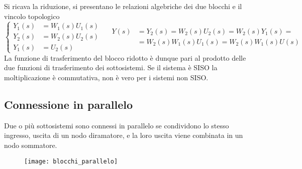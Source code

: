 Si ricava la riduzione, si presentano le relazioni algebriche dei due blocchi e
il vincolo topologico
$$\left\{\begin{aligned}
Y_1(s) &= W_1(s)U_1(s) \\
Y_2(s) &= W_2(s) U_2(s) \\
Y_1(s) &= U_2(s)
\end{aligned}\right.
\quad
\begin{aligned}
Y(s) &= Y_2(s) = W_2(s)U_2(s) = W_2(s)Y_1(s) =\\
&=W_2(s)W_1(s)U_1(s) = W_2(s)W_1(s)U(s)
\end{aligned}$$
La funzione di trasferimento del blocco ridotto è dunque pari al prodotto delle
due funzioni di trasferimento dei sottosistemi.
Se il sistema è SISO la moltiplicazione è commutativa, non è vero per i sistemi
non SISO.

\newpage
\subsection{Connessione in parallelo}
Due o più sottosistemi sono connessi in parallelo se condividono lo stesso
ingresso, uscita di un nodo diramatore, e la loro uscita viene combinata in un
nodo sommatore.
\begin{figure}[h]
\centering
\texttt{[image: blocchi\_parallelo]}
\end{figure}

